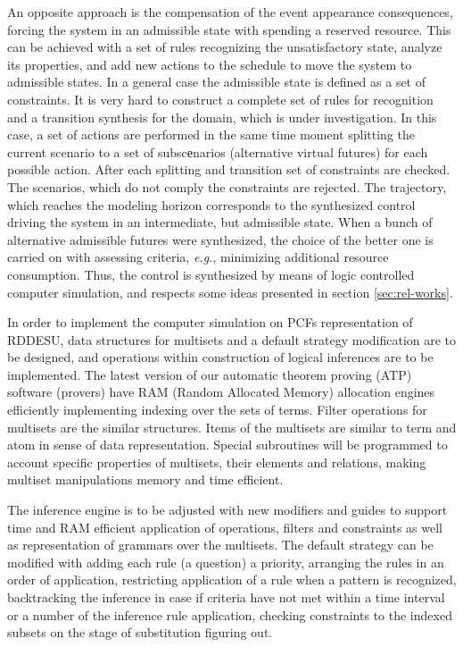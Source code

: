 \documentclass[conference]{IEEEtran}
\begin{document}
An opposite approach is the compensation of the event appearance consequences, forcing the system in an admissible state with spending a reserved resource. This can be achieved with a set of rules recognizing the unsatisfactory state, analyze its properties, and add new actions to the schedule to move the system to admissible states. In a general case the admissible state is defined as a set of constraints. It is very hard to construct a complete set of rules for recognition and a transition synthesis for the domain, which is under investigation. In this case, a set of actions are performed in the same time moment splitting the current scenario to a set of subscеnarios (alternative virtual futures) for each possible action. After each splitting and transition set of constraints are checked. The scenarios, which do not comply the constraints are rejected. The trajectory, which reaches the modeling horizon corresponds to the synthesized control driving the system in an intermediate, but admissible state. When a bunch of alternative admissible futures were synthesized, the choice of the better one is carried on with assessing criteria, \emph{e.g.}, minimizing additional resource consumption. Thus, the control is synthesized by means of logic controlled computer simulation, and respects some ideas presented in section \ref{sec:rel-works}.

In order to implement the computer simulation on PCFs representation of RDDESU, data structures for multisets and a default strategy modification are to be designed, and operations within construction of logical inferences are to be implemented.  The latest version of our automatic theorem proving (ATP) software (provers) have RAM (Random Allocated Memory) allocation engines efficiently implementing indexing over the sets of terms. Filter operations for multisets are the similar structures. Items of the multisets are similar to term and atom in sense of data representation. Special subroutines will be programmed to account specific properties of multisets, their elements and relations, making multiset manipulations memory and time efficient.

The inference engine is to be adjusted with new modifiers and guides to support time and RAM efficient application of operations, filters and constraints as well as representation of grammars over the multisets. The default strategy can be modified with adding each rule (a question) a priority, arranging the rules in an order of application, restricting application of a rule when a pattern is recognized, backtracking the inference in case if criteria have not met within a time interval or a number of the inference rule application, checking constraints to the indexed subsets on the stage of substitution figuring out.
\end{document}
